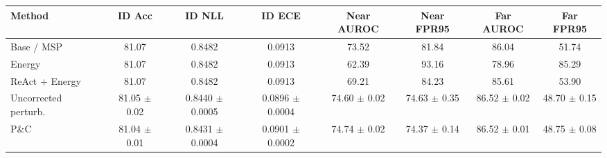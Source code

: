 \begin{tabular}{lccccccc}
\toprule
Method & ID Acc & ID NLL & ID ECE & Near AUROC & Near FPR95 & Far AUROC & Far FPR95 \\
\midrule
Base / MSP & 81.07 & 0.8482 & 0.0913 & 73.52 & 81.84 & 86.04 & 51.74 \\
Energy & 81.07 & 0.8482 & 0.0913 & 62.39 & 93.16 & 78.96 & 85.29 \\
ReAct + Energy & 81.07 & 0.8482 & 0.0913 & 69.21 & 84.23 & 85.61 & 53.90 \\
Uncorrected perturb. & 81.05 $\pm$ 0.02 & 0.8440 $\pm$ 0.0005 & 0.0896 $\pm$ 0.0004 & 74.60 $\pm$ 0.02 & 74.63 $\pm$ 0.35 & 86.52 $\pm$ 0.02 & 48.70 $\pm$ 0.15 \\
P\&C & 81.04 $\pm$ 0.01 & 0.8431 $\pm$ 0.0004 & 0.0901 $\pm$ 0.0002 & 74.74 $\pm$ 0.02 & 74.37 $\pm$ 0.14 & 86.52 $\pm$ 0.01 & 48.75 $\pm$ 0.08 \\
\bottomrule
\end{tabular}
